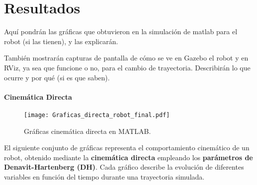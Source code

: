 \chapter{Resultados} \label{chap:resultados}
Aquí pondrán las gráficas que obtuvieron en la simulación de matlab para el robot (si las tienen), y las explicarán.

También mostrarán capturas de pantalla de cómo se ve en Gazebo el robot y en RViz, ya sea que funcione o no, para el cambio de trayectoria. Describirán lo que ocurre y por qué (si es que saben).

\subsubsection{Cinemática Directa}
\begin{figure}[H] 
	\centering
	\texttt{[image: Graficas\_directa\_robot\_final.pdf]}
	\caption{Gráficas cinemática directa en MATLAB.}
	\label{fig:TablasCinematicaDirecta}
\end{figure}

 
 El siguiente conjunto de gráficas representa el comportamiento cinemático de un robot, obtenido mediante la \textbf{cinemática directa} empleando los \textbf{parámetros de Denavit-Hartenberg (DH)}. Cada gráfico describe la evolución de diferentes variables en función del tiempo durante una trayectoria simulada.
 
